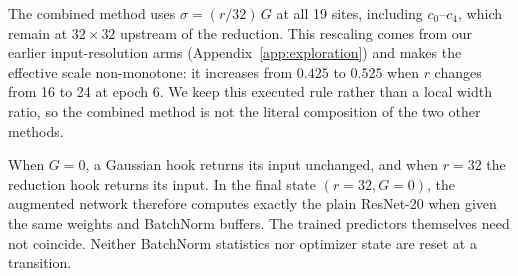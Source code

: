 The combined method uses $\sigma=(r/32)\,G$ at all 19 sites, including $c_0$--$c_4$, which remain at $32\times32$ upstream of the reduction. This rescaling comes from our earlier input-resolution arms (Appendix~\ref{app:exploration}) and makes the effective scale non-monotone: it increases from $0.425$ to $0.525$ when $r$ changes from 16 to 24 at epoch 6. We keep this executed rule rather than a local width ratio, so the combined method is not the literal composition of the two other methods.

When $G=0$, a Gaussian hook returns its input unchanged, and when $r=32$ the reduction hook returns its input. In the final state $(r=32,G=0)$, the augmented network therefore computes exactly the plain ResNet-20 when given the same weights and BatchNorm buffers. The trained predictors themselves need not coincide. Neither BatchNorm statistics nor optimizer state are reset at a transition.
